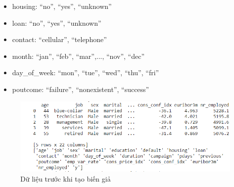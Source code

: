 \documentclass{report}
\newcommand\tab[1][1.25cm]{\hspace*{#1}}
\begin{document}
\begin{enumerate}
\begin{itemize}
                            \item housing:
                                \newline\tab “no”, “yes”, “unknown”
                            \item loan:
                                \newline\tab “no”, “yes”, “unknown”
                            \item contact:
                                \newline\tab “cellular”, “telephone”
                            \item month:
                                \newline\tab “jan”, “feb”, “mar”,..., “nov”, “dec”
                            \item day\_of\_week:
                                \newline\tab “mon”, “tue”, “wed”, “thu”, “fri”
                            \item poutcome:
                                \newline\tab “failure”, “nonexistent”, “success”
                        \end{itemize}
    \begin{center}
        \begin{figure}[htp]
    	\begin{center}
    		\includegraphics[scale =0.9]{images/nummy1.PNG}
    	\end{center}
    		\caption{Dữ liệu trước khi tạo biến giả}
    \end{figure}
        \end{center}
\pagebreak
            \begin{center}
        \begin{figure}[htp]
    	\begin{center}

\end{center}
\end{figure}
\end{center}
\end{enumerate}
\end{document}
